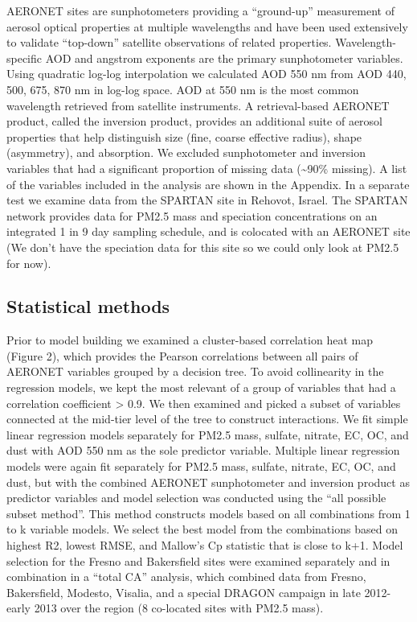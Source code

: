 \documentclass[, manuscript]{copernicus}
\begin{document}
AERONET sites are sunphotometers providing a ``ground-up'' measurement
of aerosol optical properties at multiple wavelengths and have been used
extensively to validate ``top-down'' satellite observations of related
properties. Wavelength-specific AOD and angstrom exponents are the
primary sunphotometer variables. Using quadratic log-log interpolation
we calculated AOD 550 nm from AOD 440, 500, 675, 870 nm in log-log
space. AOD at 550 nm is the most common wavelength retrieved from
satellite instruments. A retrieval-based AERONET product, called the
inversion product, provides an additional suite of aerosol properties
that help distinguish size (fine, coarse effective radius), shape
(asymmetry), and absorption. We excluded sunphotometer and inversion
variables that had a significant proportion of missing data
(\textasciitilde{}90\% missing). A list of the variables included in the
analysis are shown in the Appendix. In a separate test we examine data
from the SPARTAN site in Rehovot, Israel. The SPARTAN network provides
data for PM2.5 mass and speciation concentrations on an integrated 1 in
9 day sampling schedule, and is colocated with an AERONET site (We don't
have the speciation data for this site so we could only look at PM2.5
for now).

\subsection{Statistical methods}

Prior to model building we examined a cluster-based correlation heat map
(Figure 2), which provides the Pearson correlations between all pairs of
AERONET variables grouped by a decision tree. To avoid collinearity in
the regression models, we kept the most relevant of a group of variables
that had a correlation coefficient \textgreater{}
\textbar{}0.9\textbar{}. We then examined and picked a subset of
variables connected at the mid-tier level of the tree to construct
interactions. We fit simple linear regression models separately for
PM2.5 mass, sulfate, nitrate, EC, OC, and dust with AOD 550 nm as the
sole predictor variable. Multiple linear regression models were again
fit separately for PM2.5 mass, sulfate, nitrate, EC, OC, and dust, but
with the combined AERONET sunphotometer and inversion product as
predictor variables and model selection was conducted using the ``all
possible subset method''. This method constructs models based on all
combinations from 1 to k variable models. We select the best model from
the combinations based on highest R2, lowest RMSE, and Mallow's Cp
statistic that is close to k+1. Model selection for the Fresno and
Bakersfield sites were examined separately and in combination in a
``total CA'' analysis, which combined data from Fresno, Bakersfield,
Modesto, Visalia, and a special DRAGON campaign in late 2012-early 2013
over the region (8 co-located sites with PM2.5 mass).
\end{document}
